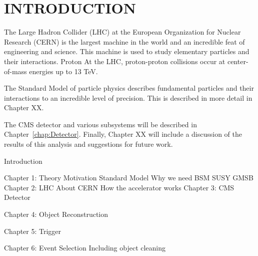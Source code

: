 \chapter{INTRODUCTION}

The Large Hadron Collider (LHC) at the European Organization for Nuclear Research (CERN) is the largest machine in the world and an incredible feat of engineering and science. This machine is used to study elementary particles and their interactions. Proton At the LHC, proton-proton collisions occur at center-of-mass energies up to 13 TeV. 

The Standard Model of particle physics describes fundamental particles and their interactions to an incredible level of precision. This is described in more detail in  Chapter XX. 

The CMS detector and various subsystems will be described in Chapter~\ref{chap:Detector}. Finally, Chapter XX will include a discussion of the results of this analysis and suggestions for future work.

Introduction

Chapter 1: Theory Motivation
	Standard Model
	Why we need BSM
	SUSY
	GMSB
Chapter 2: LHC
	About CERN
	How the accelerator works
Chapter 3: CMS Detector

Chapter 4: Object Reconstruction

Chapter 5: Trigger

Chapter 6: Event Selection
	Including object cleaning
	